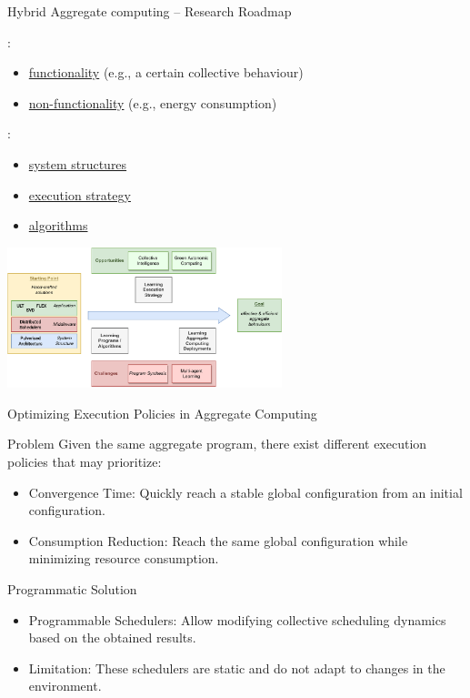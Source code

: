 \documentclass[presentation, 9pt,169]{beamer}\mode<presentation>{\usetheme{AMSBolognaFC}}
\begin{document}
\begin{frame}{Hybrid Aggregate computing -- Research Roadmap}
  
  :
  \begin{itemize}
    \item \underline{functionality} (e.g., a certain collective behaviour)
    \item \underline{non-functionality} (e.g., energy consumption)
  \end{itemize}
  :
  \begin{itemize}
    \item \underline{system structures}
    \item \underline{execution strategy}
    \item \underline{algorithms}
  \end{itemize}
  \begin{center}
    \includegraphics[width=0.6\textwidth]{img/roadmap.pdf}
  \end{center}
\end{frame}
\begin{frame}{Optimizing Execution Policies in Aggregate Computing}

\begin{alertblock}{Problem}
Given the same aggregate program, there exist different execution policies that may prioritize:
\begin{itemize}
\item Convergence Time: Quickly reach a stable global configuration from an initial configuration.
\item Consumption Reduction: Reach the same global configuration while minimizing resource consumption.
\end{itemize}
\end{alertblock}
\begin{alertblock}{Programmatic Solution}
\begin{itemize}
\item Programmable Schedulers: Allow modifying collective scheduling dynamics based on the obtained results.
\item Limitation: These schedulers are static and do not adapt to changes in the environment.
\end{itemize}
\end{alertblock}
\end{frame}
\end{document}
